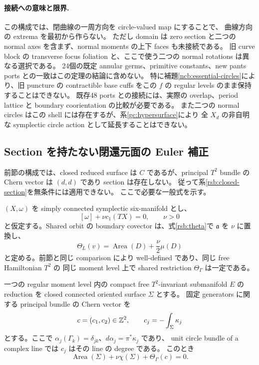 \paragraph{接続への意味と限界.}
この構成では、閉曲線の一周方向を circle-valued map にすることで、
曲線方向の extrema を最初から作らない。
ただし domain は zero section と二つの normal axes を含まず、normal moments の上下 faces も未接続である。
旧 curve block の transverse focus foliation と、ここで使う二つの normal rotations は異なる選択である。
24個の既定 annular germs、primitive constants、new pants ports との一致はこの定理の結論に含めない。
特に補題\ref{ncb:essential-circles}により、旧 puncture の contractible base cuffs をこの $f$ の
regular levels のまま保持することはできない。
既存48 ports との接続には、実際の overlap、period lattice と boundary coorientation の比較が必要である。
また二つの normal circles はこの shell には存在するが、系\ref{gc:hypersurface}により
全 $X_d$ の非自明な symplectic circle action として延長することはできない。

\subsection{Section を持たない閉還元面の Euler 補正}

前節の構成では、closed reduced surface は $C$ であるが、principal $T^2$ bundle の
Chern vector は $(d,d)$ であり section は存在しない。
従って系\ref{rsb:closed-section}を無条件には適用できない。
ここで必要な一般式を示す。

$(X,\omega)$ を simply connected symplectic six-manifold とし、
\[
 [\omega]+\nu c_1(TX)=0,\qquad\nu>0
\]
と仮定する。Shared orbit の boundary covector は、式\eqref{rsb:theta}で $\mathfrak a$ を $\nu$ に置換し、
\[
 \Theta_L(v)=\operatorname{Area}(D)+\frac\nu2\mu(D)
\]
と定める。前節と同じ comparison により well-defined であり、同じ free Hamiltonian $T^2$ の
同じ moment level 上で shared restriction $\Theta_\Gamma$ は一定である。

\begin{proposition}\label{ncb:closed-budget}
一つの regular moment level 内の compact free $T^2$-invariant submanifold $E$ の reduction を
closed connected oriented surface $\Sigma$ とする。
固定 generators に関する principal bundle の Chern vector を
\[
 c=(c_1,c_2)\in\mathbb Z^2,\qquad
 c_j=-\int_\Sigma\kappa_j
\]
とする。ここで $\alpha_j(\Gamma_k)=\delta_{jk}$、$d\alpha_j=\pi^*\kappa_j$ であり、
unit circle bundle of a complex line では $c_j$ はその line の degree である。
このとき
\begin{equation}\label{ncb:closed-budget-equation}
 \boxed{\quad
 \operatorname{Area}(\Sigma)+\nu\chi(\Sigma)+\Theta_\Gamma(c)=0.
 \quad}
\end{equation}
\end{proposition}

